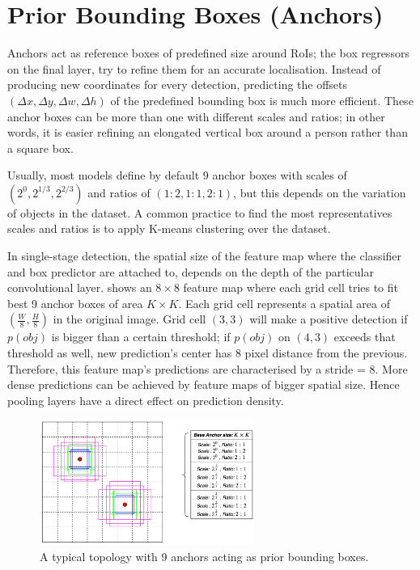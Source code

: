 \section{Prior Bounding Boxes (Anchors)}
Anchors act as reference boxes of predefined size around RoIs; the box regressors on the final layer, try to refine them for an accurate localisation. Instead of producing new coordinates for every detection, predicting the offsets $(\Delta x, \Delta y, \Delta w, \Delta h)$ of the predefined bounding box is much more efficient. These anchor boxes can be more than one with different scales and ratios; in other words, it is easier refining an elongated vertical box around a person rather than a square box. 

Usually, most models define by default 9 anchor boxes with scales of $(2^0, 2^{1/3}, 2^{2/3})$ and ratios of $(1\!:\!2,1\!:\!1,2\!:\!1)$, but this depends on the variation of objects in the dataset. A common practice to find the most representatives scales and ratios is to apply K-means clustering over the dataset.

In single-stage detection, the spatial size of the feature map where the classifier and box predictor are attached to, depends on the depth of the particular convolutional layer.  shows an $8\times8$ feature map where each grid cell tries to fit best 9 anchor boxes of area $K\times K$. Each grid cell represents a spatial area of $(\frac{W}{8}, \frac{H}{8})$ in the original image. Grid cell $(3,3)$ will make a positive detection if $p(obj)$ is bigger than a certain threshold; if $p(obj)$ on $(4,3)$ exceeds that threshold as well, new prediction's center has 8 pixel distance from the previous. Therefore, this feature map's predictions are characterised by a stride = 8. More dense predictions can be achieved by feature maps of bigger spatial size. Hence pooling layers have a direct effect on prediction density.

 \begin{figure}[!htb]
  \centering
  \includegraphics[width=7cm]{../figures/ch2/fig7.png}
  \caption{A typical topology with 9 anchors acting as prior bounding boxes.}
  \label{fig7}
\end{figure} 

